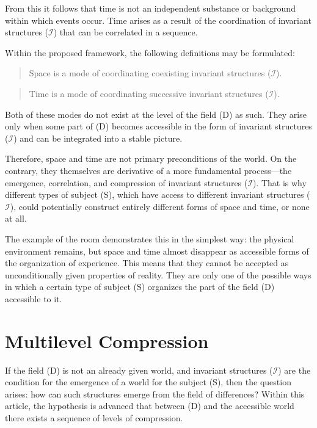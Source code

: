 \documentclass[aps,prd,onecolumn,nofootinbib,superscriptaddress]{revtex4-2} %
\begin{document}
    From this it follows that time is not an independent substance or background within which events occur. Time arises as a result of the coordination of invariant structures ($\mathcal{I}$) that can be correlated in a sequence.

    Within the proposed framework, the following definitions may be formulated:

    \begin{quote}
        Space is a mode of coordinating coexisting invariant structures ($\mathcal{I}$).
    \end{quote}

    \begin{quote}
        Time is a mode of coordinating successive invariant structures ($\mathcal{I}$).
    \end{quote}

    Both of these modes do not exist at the level of the field (D) as such. They arise only when some part of (D) becomes accessible in the form of invariant structures ($\mathcal{I}$) and can be integrated into a stable picture.

    Therefore, space and time are not primary preconditions of the world. On the contrary, they themselves are derivative of a more fundamental process—the emergence, correlation, and compression of invariant structures ($\mathcal{I}$). That is why different types of subject (S), which have access to different invariant structures ($\mathcal{I}$), could potentially construct entirely different forms of space and time, or none at all.

    The example of the room demonstrates this in the simplest way: the physical environment remains, but space and time almost disappear as accessible forms of the organization of experience. This means that they cannot be accepted as unconditionally given properties of reality. They are only one of the possible ways in which a certain type of subject (S) organizes the part of the field (D) accessible to it.


    \section{Multilevel Compression}
    If the field (D) is not an already given world, and invariant structures ($\mathcal{I}$) are the condition for the emergence of a world for the subject (S), then the question arises: how can such structures emerge from the field of differences? Within this article, the hypothesis is advanced that between (D) and the accessible world there exists a sequence of levels of compression.
\end{document}

